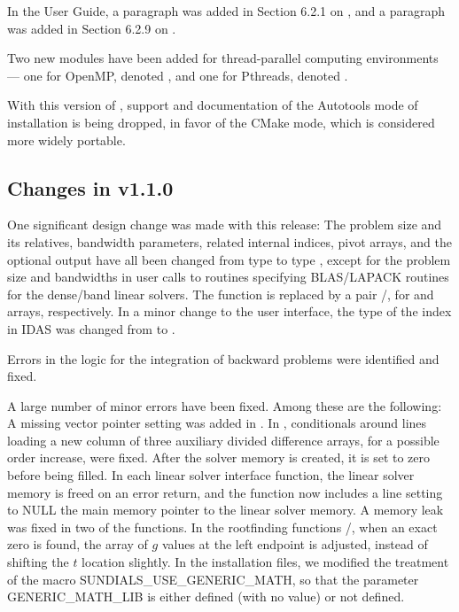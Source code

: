 In the User Guide, a paragraph was added in Section 6.2.1 on
, and a paragraph was added in Section 6.2.9 on
.

Two new {\nvector} modules have been added for thread-parallel computing
environments --- one for OpenMP, denoted ,
and one for Pthreads, denoted .

With this version of {\sundials}, support and documentation of the
Autotools mode of installation is being dropped, in favor of the
CMake mode, which is considered more widely portable.

\subsection*{Changes in v1.1.0}

One significant design change was made with this release: The problem
size and its relatives, bandwidth parameters, related internal indices,
pivot arrays, and the optional output  have all been
changed from type  to type , except for the
problem size and bandwidths in user calls to routines specifying
BLAS/LAPACK routines for the dense/band linear solvers.  The function
 is replaced by a pair /,
for  and  arrays, respectively.  In a minor
change to the user interface, the type of the index  in
IDAS was changed from  to .

Errors in the logic for the integration of backward problems were
identified and fixed.

A large number of minor errors have been fixed.  Among these are the following:
A missing vector pointer setting was added in .
In , conditionals around lines loading a new column of three
auxiliary divided difference arrays, for a possible order increase, were fixed.
After the solver memory is created, it is set to zero before being filled.
In each linear solver interface function, the linear solver memory is
freed on an error return, and the  function now includes a
line setting to NULL the main memory pointer to the linear solver memory.
A memory leak was fixed in two of the  functions.
In the rootfinding functions /, when an exact
zero is found, the array  of $g$ values at the left endpoint is
adjusted, instead of shifting the $t$ location  slightly.
In the installation files, we modified the treatment of the macro
SUNDIALS\_USE\_GENERIC\_MATH, so that the parameter GENERIC\_MATH\_LIB is
either defined (with no value) or not defined.


